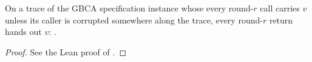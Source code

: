 \begin{theorem}
  \label{thm:gbca-spec-validity}
  \leanok
  On a trace of the GBCA specification instance whose every round-$r$ call carries $v$ unless its caller is corrupted somewhere along the trace, every round-$r$ return hands out $v$: .
\end{theorem}

\begin{proof}\leanok
  See the Lean proof of .
\end{proof}
